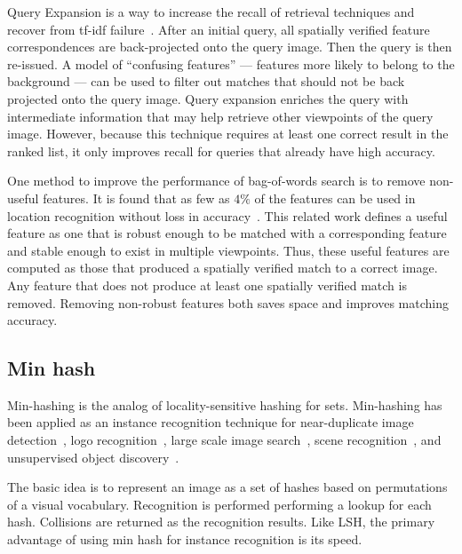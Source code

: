             Query Expansion is a way to increase the recall of retrieval techniques and recover from tf-idf
            failure~\cite{chum_total_2007, chum_total_2011, arandjelovic_three_2012, tolias_visual_2014}. After an
            initial query, all spatially verified feature correspondences are back-projected onto the query image.
            Then the query is then re-issued. A model of ``confusing features'' --- features more likely to belong
            to the background --- can be used to filter out matches that should not be back projected onto the
            query image. Query expansion enriches the query with intermediate information that may help retrieve
            other viewpoints of the query image. However, because this technique requires at least one correct
            result in the ranked list, it only improves recall for queries that already have high accuracy.

            One method to improve the performance of bag-of-words search is to remove non-useful features. It is
            found that as few as $4\percent$ of the features can be used in location recognition without loss in
            accuracy~\cite{turcot_better_2009}. This related work defines a useful feature as one that is robust
            enough to be matched with a corresponding feature and stable enough to exist in multiple viewpoints.
            Thus, these useful features are computed as those that produced a spatially verified match to a correct
            image. Any feature that does not produce at least one spatially verified match is removed. Removing
            non-robust features both saves space and improves matching accuracy.

    \subsection{Min hash}
        Min-hashing is the analog of locality-sensitive hashing for sets. Min-hashing has been applied as an
        instance recognition technique for near-duplicate image detection~\cite{chum_near_2008}, logo
        recognition~\cite{romberg_bundle_2013}, large scale image search~\cite{wang_semi_supervised_2012}, scene
        recognition~\cite{zhang_image_2011}, and unsupervised object discovery~\cite{chum_geometric_2009,
        chum_large_scale_2010}.

        The basic idea is to represent an image as a set of hashes based on permutations of a visual vocabulary.
        Recognition is performed performing a lookup for each hash. Collisions are returned as the recognition
        results. Like LSH, the primary advantage of using min hash for instance recognition is its speed.

